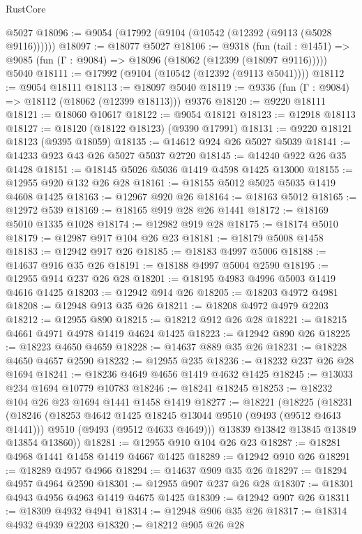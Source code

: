 \begin{lexlean}{RustCore}
\begin{coremodule}
    @5027
@18096 := @9054 (@17992 (@9104 (@10542 (@12392 (@9113 (@5028 @9116))))))
@18097 := @18077 @5027
@18106 := @9318
    (fun (tail : @1451) => @9085 (fun (Γ : @9084) => @18096 (@18062 (@12399 (@18097 @9116)))))
    @5040
@18111 := @17992 (@9104 (@10542 (@12392 (@9113 @5041))))
@18112 := @9054 @18111
@18113 := @18097 @5040
@18119 := @9336 (fun (Γ : @9084) => @18112 (@18062 (@12399 @18113))) @9376
@18120 := @9220 @18111
@18121 := @18060 @10617
@18122 := @9054 @18121
@18123 := @12918 @18113
@18127 := @18120 (@18122 @18123) (@9390 @17991)
@18131 := @9220 @18121 @18123 (@9395 @18059)
@18135 := @14612 @924 @26 @5027 @5039
@18141 := @14233 @923 @43 @26 @5027 @5037 @2720
@18145 := @14240 @922 @26 @35 @1428
@18151 := @18145 @5026 @5036 @1419 @4598 @1425 @13000
@18155 := @12955 @920 @132 @26 @28
@18161 := @18155 @5012 @5025 @5035 @1419 @4608 @1425
@18163 := @12967 @920 @26
@18164 := @18163 @5012
@18165 := @12972 @539
@18169 := @18165 @919 @28 @26 @1441
@18172 := @18169 @5010 @1335 @1028
@18174 := @12982 @919 @28
@18175 := @18174 @5010
@18179 := @12987 @917 @104 @26 @23
@18181 := @18179 @5008 @1458
@18183 := @12942 @917 @26
@18185 := @18183 @4997 @5006
@18188 := @14637 @916 @35 @26
@18191 := @18188 @4997 @5004 @2590
@18195 := @12955 @914 @237 @26 @28
@18201 := @18195 @4983 @4996 @5003 @1419 @4616 @1425
@18203 := @12942 @914 @26
@18205 := @18203 @4972 @4981
@18208 := @12948 @913 @35 @26
@18211 := @18208 @4972 @4979 @2203
@18212 := @12955 @890
@18215 := @18212 @912 @26 @28
@18221 := @18215 @4661 @4971 @4978 @1419 @4624 @1425
@18223 := @12942 @890 @26
@18225 := @18223 @4650 @4659
@18228 := @14637 @889 @35 @26
@18231 := @18228 @4650 @4657 @2590
@18232 := @12955 @235
@18236 := @18232 @237 @26 @28 @1694
@18241 := @18236 @4649 @4656 @1419 @4632 @1425
@18245 := @13033 @234 @1694 @10779 @10783
@18246 := @18241 @18245
@18253 := @18232 @104 @26 @23 @1694 @1441 @1458 @1419
@18277 := @18221
    (@18225
      (@18231
        (@18246
          (@18253 @4642 @1425 @18245 @13044 @9510 (@9493 (@9512 @4643 @1441)))
          @9510
          (@9493 (@9512 @4633 @4649)))
        @13839
        @13842
        @13845
        @13849
        @13854
        @13860))
@18281 := @12955 @910 @104 @26 @23
@18287 := @18281 @4968 @1441 @1458 @1419 @4667 @1425
@18289 := @12942 @910 @26
@18291 := @18289 @4957 @4966
@18294 := @14637 @909 @35 @26
@18297 := @18294 @4957 @4964 @2590
@18301 := @12955 @907 @237 @26 @28
@18307 := @18301 @4943 @4956 @4963 @1419 @4675 @1425
@18309 := @12942 @907 @26
@18311 := @18309 @4932 @4941
@18314 := @12948 @906 @35 @26
@18317 := @18314 @4932 @4939 @2203
@18320 := @18212 @905 @26 @28

\end{coremodule}
\end{lexlean}
